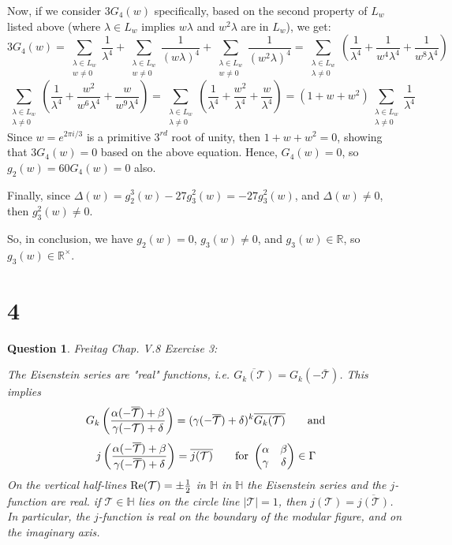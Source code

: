 \documentclass{article}
\newtheorem{question}{Question}
\begin{document}
\begin{itemize}
    Now, if we consider $3G_4(w)$ specifically, based on the second property of $L_w$ listed above (where $\lambda\in L_w$ implies $w\lambda$ and $w^2\lambda$ are in $L_w$), we get:
    $$3G_4(w) = \sum_{\substack{\lambda\in L_w\\w\neq 0}}\frac{1}{\lambda^4}+\sum_{\substack{\lambda\in L_w\\w\neq 0}}\frac{1}{(w\lambda)^4}+\sum_{\substack{\lambda\in L_w\\w\neq 0}}\frac{1}{(w^2\lambda)^4} = \sum_{\substack{\lambda\in L_w\\\lambda\neq 0}}\left(\frac{1}{\lambda^4}+\frac{1}{w^4\lambda^4}+\frac{1}{w^8\lambda^4}\right)$$
    $$\sum_{\substack{\lambda\in L_w\\\lambda\neq 0}}\left(\frac{1}{\lambda^4}+\frac{w^2}{w^6\lambda^4}+\frac{w}{w^9\lambda^4}\right)=\sum_{\substack{\lambda\in L_w\\\lambda\neq 0}}\left(\frac{1}{\lambda^4}+\frac{w^2}{\lambda^4}+\frac{w}{\lambda^4}\right) = (1+w+w^2)\sum_{\substack{\lambda\in L_w\\\lambda\neq 0}}\frac{1}{\lambda^4}$$
    Since $w=e^{2\pi i/3}$ is a primitive $3^{rd}$ root of unity, then $1+w+w^2=0$, showing that $3G_4(w)=0$ based on the above equation. Hence, $G_4(w)=0$, so $g_2(w)=60G_4(w)=0$ also.

    Finally, since $\Delta(w)=g_2^3(w)-27g_3^2(w) = -27g_3^2(w)$, and $\Delta(w)\neq 0$, then $g_3^2(w)\neq 0$.

    So, in conclusion, we have $g_2(w)=0$, $g_3(w)\neq 0$, and $g_3(w)\in\mathbb{R}$, so $g_3(w)\in\mathbb{R}^\times$.
\end{itemize}

\break

\section*{4}
\begin{myBox}[]{}
    \begin{question}
        Freitag Chap. V.8 Exercise 3:

        The Eisenstein series are "real" functions, i.e. $\overline{G_k(\mathcal{T})}=G_k(-\overline{\mathcal{T}})$. This implies 
        $$G_k\left(\frac{\alpha(-\overline{\mathcal{T}})+\beta}{\gamma(-\mathcal{T})+\delta}\right) = (\gamma(-\overline{\mathcal{T}})+\delta)^k\overline{G_k(\mathcal{T})} \quad \quad \textmd{and}$$
        $$j\left(\frac{\alpha(-\overline{\mathcal{T}})+\beta}{\gamma(-\overline{\mathcal{T}})+\delta}\right)=\overline{j(\mathcal{T})}\quad\quad \textmd{for } \begin{pmatrix}\alpha&\beta\\\gamma&\delta\end{pmatrix}\in \Gamma$$
        On the vertical half-lines $\textmd{Re}(\mathcal{T})=\pm\frac{1}{2}$ in $\mathbb{H}$ in $\mathbb{H}$ the Eisenstein series and the $j$-function are real. if $\mathcal{T}\in\mathbb{H}$ lies on the circle line $|\mathcal{T}|=1$, then $j(\mathcal{T})=\overline{j(\mathcal{T})}$. In particular, the $j$-function is real on the boundary of the modular figure, and on the imaginary axis.
    \end{question}
\end{myBox}
\end{document}
